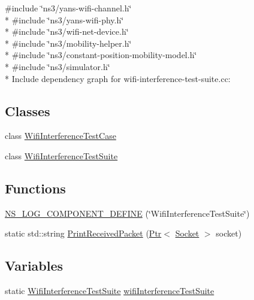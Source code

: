 {\ttfamily \#include \char`\"{}ns3/yans-\/wifi-\/channel.\+h\char`\"{}}\\*
{\ttfamily \#include \char`\"{}ns3/yans-\/wifi-\/phy.\+h\char`\"{}}\\*
{\ttfamily \#include \char`\"{}ns3/wifi-\/net-\/device.\+h\char`\"{}}\\*
{\ttfamily \#include \char`\"{}ns3/mobility-\/helper.\+h\char`\"{}}\\*
{\ttfamily \#include \char`\"{}ns3/constant-\/position-\/mobility-\/model.\+h\char`\"{}}\\*
{\ttfamily \#include \char`\"{}ns3/simulator.\+h\char`\"{}}\\*
Include dependency graph for wifi-\/interference-\/test-\/suite.cc\+:
\subsection*{Classes}
\begin{DoxyCompactItemize}
\item 
class \hyperlink{classWifiInterferenceTestCase}{Wifi\+Interference\+Test\+Case}
\item 
class \hyperlink{classWifiInterferenceTestSuite}{Wifi\+Interference\+Test\+Suite}
\end{DoxyCompactItemize}
\subsection*{Functions}
\begin{DoxyCompactItemize}
\item 
\hyperlink{wifi-interference-test-suite_8cc_adfa99954b94861a279282087821263c4}{N\+S\+\_\+\+L\+O\+G\+\_\+\+C\+O\+M\+P\+O\+N\+E\+N\+T\+\_\+\+D\+E\+F\+I\+NE} (\char`\"{}Wifi\+Interference\+Test\+Suite\char`\"{})
\item 
static std\+::string \hyperlink{wifi-interference-test-suite_8cc_ad8addb72baae43bf761d7d7621c26b21}{Print\+Received\+Packet} (\hyperlink{classns3_1_1Ptr}{Ptr}$<$ \hyperlink{classns3_1_1Socket}{Socket} $>$ socket)
\end{DoxyCompactItemize}
\subsection*{Variables}
\begin{DoxyCompactItemize}
\item 
static \hyperlink{classWifiInterferenceTestSuite}{Wifi\+Interference\+Test\+Suite} \hyperlink{wifi-interference-test-suite_8cc_ada63d801df7256f9d90682a2063a2d24}{wifi\+Interference\+Test\+Suite}
\end{DoxyCompactItemize}


